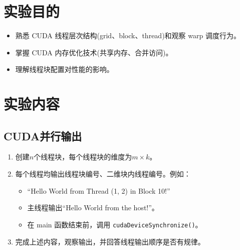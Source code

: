 \documentclass{SYSUReport}
\date{2025年5月21日}
\begin{document}
\cover
\thispagestyle{empty} %
\clearpage



\section{实验目的}
\begin{itemize}
   \item 熟悉 CUDA 线程层次结构(grid、block、thread)和观察 warp 调度行为。 
    \item 掌握 CUDA 内存优化技术(共享内存、合并访问)。
    \item 理解线程块配置对性能的影响。
\end{itemize}
\section{实验内容}
\subsection{CUDA并行输出}
\begin{enumerate}
    \item 创建$n$个线程块，每个线程块的维度为$m\times k$。
    \item 每个线程均输出线程块编号、二维块内线程编号。例如：
    \begin{itemize}
        \item “Hello World from Thread (1, 2) in Block 10!”
         \item 主线程输出“Hello World from the host!”。 
        \item 在 main 函数结束前，调用 \texttt{cudaDeviceSynchronize()}。  
    \end{itemize}
    \item 完成上述内容，观察输出，并回答线程输出顺序是否有规律。 
\end{enumerate}
\end{document}
